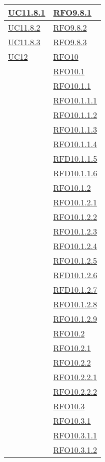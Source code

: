 \begin{longtable}{|>{\centering}m{5cm}|m{5cm}<{\centering}|}
\hyperlink{UC11.8.1}{UC11.8.1} & \hyperlink{RFO9.8.1}{RFO9.8.1}\\\hline
\hyperlink{UC11.8.2}{UC11.8.2} & \hyperlink{RFO9.8.2}{RFO9.8.2}\\\hline
\hyperlink{UC11.8.3}{UC11.8.3} & \hyperlink{RFO9.8.3}{RFO9.8.3}\\\hline

\hyperlink{UC12}{UC12}
& \hyperlink{RFO10}{RFO10}\\
& \hyperlink{RFO10.1}{RFO10.1}\\
& \hyperlink{RFO10.1.1}{RFO10.1.1}\\
& \hyperlink{RFO10.1.1.1}{RFO10.1.1.1}\\
& \hyperlink{RFO10.1.1.2}{RFO10.1.1.2}\\
& \hyperlink{RFO10.1.1.3}{RFO10.1.1.3}\\
& \hyperlink{RFO10.1.1.4}{RFO10.1.1.4}\\
& \hyperlink{RFD10.1.1.5}{RFD10.1.1.5}\\
& \hyperlink{RFD10.1.1.6}{RFD10.1.1.6}\\
& \hyperlink{RFO10.1.2}{RFO10.1.2}\\
& \hyperlink{RFO10.1.2.1}{RFO10.1.2.1}\\
& \hyperlink{RFO10.1.2.2}{RFO10.1.2.2}\\
& \hyperlink{RFO10.1.2.3}{RFO10.1.2.3}\\
& \hyperlink{RFO10.1.2.4}{RFO10.1.2.4}\\
& \hyperlink{RFO10.1.2.5}{RFO10.1.2.5}\\
& \hyperlink{RFD10.1.2.6}{RFD10.1.2.6}\\
& \hyperlink{RFD10.1.2.7}{RFD10.1.2.7}\\
& \hyperlink{RFO10.1.2.8}{RFO10.1.2.8}\\
& \hyperlink{RFO10.1.2.9}{RFO10.1.2.9}\\
& \hyperlink{RFO10.2}{RFO10.2}\\
& \hyperlink{RFO10.2.1}{RFO10.2.1}\\
& \hyperlink{RFO10.2.2}{RFO10.2.2}\\
& \hyperlink{RFO10.2.2.1}{RFO10.2.2.1}\\
& \hyperlink{RFO10.2.2.2}{RFO10.2.2.2}\\
& \hyperlink{RFO10.3}{RFO10.3}\\
& \hyperlink{RFO10.3.1}{RFO10.3.1}\\
& \hyperlink{RFO10.3.1.1}{RFO10.3.1.1}\\
& \hyperlink{RFO10.3.1.2}{RFO10.3.1.2}\\

\end{longtable}

